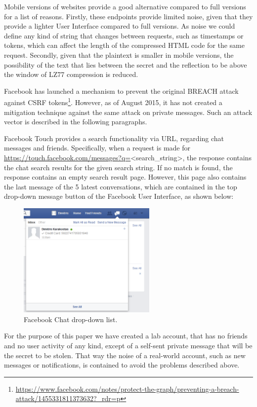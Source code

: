 Mobile versions of websites provide a good alternative compared to full versions
for a list of reasons. Firstly, these endpoints provide limited noise, given
    that they provide a lighter User Interface compared to full versions. As
    noise we could define any kind of string that changes between requests, such
    as timestamps or tokens, which can affect the length of the compressed HTML
    code for the same request. Secondly, given that the plaintext is smaller in
    mobile versions, the possibility of the text that lies between the secret
    and the reflection to be above the window of LZ77 compression is reduced.

Facebook has launched a mechanism to prevent the original BREACH attack against
CSRF
tokens\footnote{\url{https://www.facebook.com/notes/protect-the-graph/preventing-a-breach-attack/1455331811373632?_rdr=p}}.
However, as of August 2015, it has not created a mitigation technique against
the same attack on private messages. Such an attack vector is described in the
following paragraphs.

Facebook Touch provides a search functionality via URL, regarding chat messages
and friends. Specifically, when a request is made for
\url{https://touch.facebook.com/messages?q=}<search\_string>, the response
contains the chat search results for the given search string. If no match is
found, the response contains an empty search result page. However, this page
also contains the last message of the 5 latest conversations, which are
contained in the top drop-down message button of the Facebook User Interface, as
shown below:

\begin{figure}[H] \caption{Facebook Chat drop-down list.} \centering
\includegraphics[width=0.6\textwidth]{diagrams/fb_message.png}\end{figure}

For the purpose of this paper we have created a lab account, that has no friends
and no user activity of any kind, except of a self-sent private message that
will be the secret to be stolen. That way the noise of a real-world account,
such as new messages or notifications, is contained to avoid the problems
described above.

